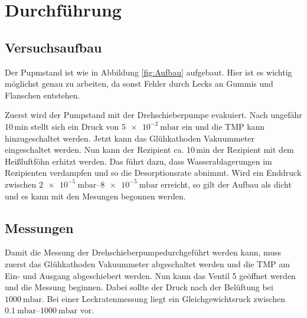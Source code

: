 \newpage
\section{Durchführung}
\label{sec:Durchführung}

\subsection{Versuchsaufbau}
Der Pupmstand ist wie in Abbildung \ref{fig:Aufbau} aufgebaut. Hier ist es wichtig
möglichst genau zu arbeiten, da sonst Fehler durch Lecks an Gummis und Flanschen
entstehen.

Zuerst wird der Pumpstand mit der Drehschieberpumpe evakuiert. Nach ungefähr 10$\,$min
stellt sich ein Druck von $\SI{5e-2}{\milli\bar}$ ein und die TMP kann hinzugeschaltet
werden.
Jetzt kann das Glühkathoden Vakuummeter eingeschaltet werden. Nun kann der Rezipient
ca. 10$\,$min der Rezipient mit dem Heißluftföhn erhitzt werden. Das führt dazu,
dass Wasserablagerungen im Rezipienten verdampfen und so die Desorptionsrate abnimmt.
Wird ein Enddruck zwischen $\SIrange{2e-5}{8e-5}{\milli\bar}$ erreicht, so gilt der
Aufbau als dicht und es kann mit den Mesungen begonnen werden.

\subsection{Messungen}
Damit die Messung der Drehschieberpumpedurchgeführt werden kann, muss zuerst das
Glühkathoden Vakuummeter abgeschaltet werden und die TMP am Ein- und Ausgang
abgeschiebert werden.
Nun kann das Ventil 5 geöffnet werden und die Messung beginnen. Dabei sollte der
Druck nach der Belüftung bei $\SI{1000}{\milli\bar}$. Bei einer Leckratenmessung
liegt ein Gleichgewichtsruck zwischen $\SIrange{0.1}{1000}{\milli\bar}$ vor.

